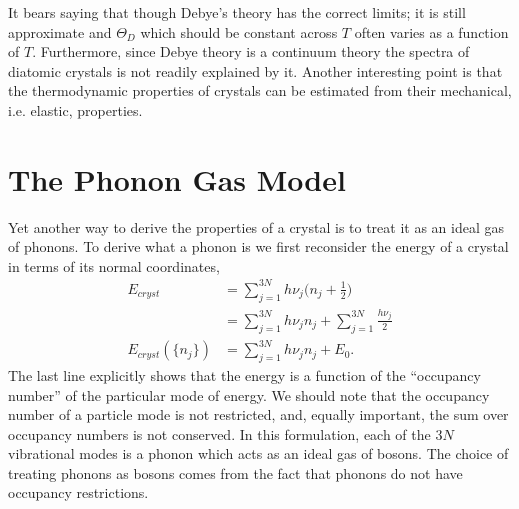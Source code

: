 It bears saying that though Debye's theory has the correct limits; it is still
approximate and $\Theta_D$ which should be constant across $T$ often varies as a
function of $T$. Furthermore, since Debye theory is a continuum theory the
spectra of diatomic crystals is not readily explained by it. Another interesting
point is that the thermodynamic properties of crystals can be estimated from
their mechanical, i.e. elastic, properties.

\section{The Phonon Gas Model}%
\label{sec:crystal_phonon}
Yet another way to derive the properties of a crystal is to treat it as an ideal
gas of phonons. To derive what a phonon is we first reconsider the energy of a
crystal in terms of its normal coordinates,
\begin{align*}
	E_{cryst} &= \sum_{j=1}^{3N}{h\nu_j (n_j + \frac{1}{2}})\\
			  &= \sum_{j=1}^{3N}{h\nu_j n_j} +
			  \sum_{j=1}^{3N}{\frac{h\nu_j}{2}}\\
	E_{cryst}(\{n_{j}\}) &= \sum_{j=1}^{3N}{h\nu_j n_j} + E_0.
\end{align*}
The last line explicitly shows that the energy is a function of the ``occupancy
number'' of the particular mode of energy. We should note that the occupancy
number of a particle mode is not restricted, and, equally important, the sum over
occupancy numbers is not conserved. In this formulation, each of the $3N$
vibrational modes is a phonon which acts as an ideal gas of bosons. The choice
of treating phonons as bosons comes from the fact that phonons do not have
occupancy restrictions.

